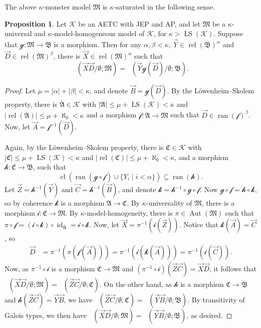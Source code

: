 \documentclass[a4paper]{amsart}
\theoremstyle{definition}
\newtheorem{proposition}[definition]{Proposition}
\theoremstyle{remark}
\newcommand{\A}{\mathcal{A}}
\newcommand{\B}{\mathcal{B}}
\newcommand{\C}{\mathcal{C}}
\newcommand{\M}{\mathcal{M}}
\DeclareMathOperator{\ran}{ran}
\DeclareMathOperator{\rel}{rel}
\newcommand{\K}{\mathcal{K}}
\DeclareMathOperator{\LS}{LS}
\theoremstyle{definition}
\renewcommand{\A}{\mathfrak{A}}
\renewcommand{\B}{\mathfrak{B}}
\renewcommand{\C}{\mathfrak{C}}
\renewcommand{\M}{\mathfrak{M}}
\DeclareMathOperator{\gtype}{tp_g}
\DeclareMathOperator{\id}{id}
\DeclareMathOperator{\Aut}{Aut}
\newcommand{\f}{\mathcal{f}}
\newcommand{\g}{\mathcal{g}}
\newcommand{\h}{\mathcal{h}}
\renewcommand{\k}{\mathcal{k}}
\DeclareMathOperator{\cl}{cl}
\begin{document}
The above $\kappa$-monster model $\M$ is $\kappa$-saturated in the following sense.
\begin{proposition}
    Let $\K$ be an AETC with JEP and AP, and let $\M$ be a  $\kappa$-universal and $\kappa$-model-homogeneous model of $\K$, for $\kappa>\LS(\K)$. Suppose that $\g\colon\M\to\B$ is a morphism. Then for any $\alpha,\beta<\kappa$, $\vec Y\in\rel(\B)^\alpha$ and $\vec D\in\rel(\M)^\beta$, there is $\vec X\in\rel(\M)^\alpha$ such that
    \[
        \gtype(\vec X\vec D / \emptyset; \M) = \gtype(\vec Y\g(\vec D) / \emptyset; \B).
    \]
\end{proposition}
\begin{proof}\quad
    \renewcommand{\i}{\mathcal i}
    Let $\mu = |\alpha|+|\beta| < \kappa$, and denote $\vec B = \g(\vec D)$. By the Löwenheim--Skolem property, there is $\A\in\K$ with $|\A|\leq\mu+\LS(\K)<\kappa$ and $|\rel(\A)|\leq\mu+\aleph_0<\kappa$ and a morphism $\f\colon\A\to\M$ such that $\vec D\in\ran(\f)^\beta$. Now, let $\vec A = \f^{-1}(\vec D)$.
        
    Again, by the Löwenheim--Skolem property, there is $\C\in\K$ with $|\C|\leq\mu+\LS(\K)<\kappa$ and $|\rel(\C)|\leq\mu+\aleph_0 < \kappa$, and a morphism $\h\colon\C\to\B$, such that
    \[
        \cl(\ran(\g\circ\f)\cup\{Y_i \mid i<\alpha\}) \subseteq \ran(\h).
    \]
    Let $\vec Z = \h^{-1}(\vec Y)$ and $\vec C = \h^{-1}(\vec B)$, and denote $\k = \h^{-1}\circ\g\circ\f$. Now $\g\circ\f = \h\circ\k$, so by coherence $\k$ is a morphism $\A\to\C$. By $\kappa$-universality of $\M$, there is a morphism $\i\colon\C\to\M$. By $\kappa$-model-homogeneity, there is $\pi\in\Aut(\M)$ such that $\pi\circ\f =(\i\circ\k)\circ \id_{\A} = \i\circ\k$. Now, let $\vec X = \pi^{-1}(\i(\vec Z))$. Notice that $\k(\vec A) = \vec C$, so
    \begin{align*}
        \vec D &= \pi^{-1}(\pi(\f(\vec A))) = \pi^{-1}(\i(\k(\vec A))) = \pi^{-1}(\i(\vec C)).
    \end{align*}
    Now, as $\pi^{-1}\circ\i$ is a morphism $\C\to\M$ and $(\pi^{-1}\circ\i)(\vec Z\vec C) = \vec X\vec D$, it follows that $\gtype(\vec X\vec D / \emptyset; \M) = \gtype(\vec Z\vec C / \emptyset; \C)$. On the other hand, as $\h$ is a morphism $\C\to\B$ and $\h(\vec Z\vec C) = \vec Y\vec B$, we have $\gtype(\vec Z\vec C / \emptyset; \C) = \gtype(\vec Y\vec B / \emptyset; \B)$. By transitivity of Galois types, we then have $\gtype(\vec X\vec D / \emptyset; \M) = \gtype(\vec Y\vec B / \emptyset; \B)$, as desired.
\end{proof}
\end{document}
